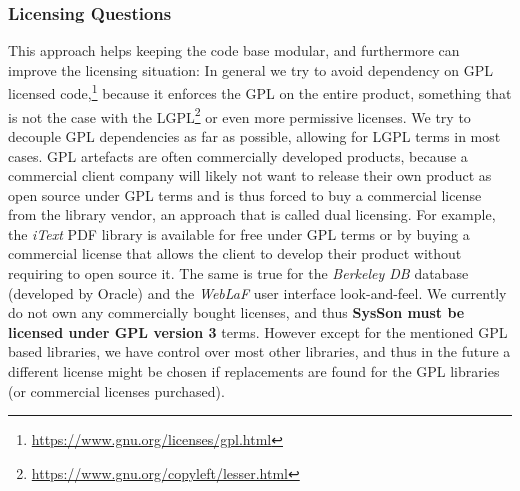 \documentclass[11pt,a4paper]{article}
\newcommand{\software}[1]{\textit{#1}}
\newcommand{\sysson}[0]{SysSon}
\begin{document}
\subsubsection{Licensing Questions}

This approach helps keeping the code base modular, and furthermore can improve the licensing situation: In general we try to avoid dependency on GPL licensed code,\footnote{\url{https://www.gnu.org/licenses/gpl.html}} because it enforces the GPL on the entire product, something that is not the case with the LGPL\footnote{\url{https://www.gnu.org/copyleft/lesser.html}} or even more permissive licenses. We try to decouple GPL dependencies as far as possible, allowing for LGPL terms in most cases. GPL artefacts are often commercially developed products, because a commercial client company will likely not want to release their own product as open source under GPL terms and is thus forced to buy a commercial license from the library vendor, an approach that is called dual licensing. For example, the \software{iText} PDF library is available for free under GPL terms or by buying a commercial license that allows the client to develop their product without requiring to open source it. The same is true for the \software{Berkeley DB} database (developed by Oracle) and the \software{WebLaF} user interface look-and-feel. We currently do not own any commercially bought licenses, and thus \textbf{\sysson{} must be licensed under GPL version 3} terms. However except for the mentioned GPL based libraries, we have control over most other libraries, and thus in the future a different license might be chosen if replacements are found for the GPL libraries (or commercial licenses purchased).
\end{document}
